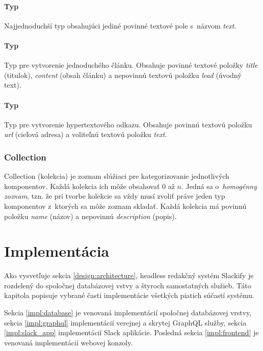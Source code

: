 \subsubsection{Typ }
Najjednoduchší typ obsahujúci jediné povinné textové pole s~názvom \emph{text}.

\subsubsection{Typ }
Typ pre vytvorenie jednoduchého článku. Obsahuje povinné textové položky \emph{title} (titulok), \emph{content} (obsah článku) a nepovinnú textovú položku \emph{lead} (úvodný text).

\subsubsection{Typ }
Typ pre vytvorenie hypertextového odkazu. Obsahuje povinnú textovú položku \emph{url} (cieľová adresa) a voliteľnú textovú položku \emph{text}.

\subsection{Collection}
\label{design:collection}
Collection (kolekcia) je zoznam slúžiaci pre kategorizovanie jednotlivých komponentov. Každá kolekcia ich môže obsahovať 0 až $n$. Jedná sa o~\emph{homogénny zoznam}, tzn. že pri tvorbe kolekcie sa vždy musí zvoliť práve jeden typ komponentov z~ktorých sa môže zoznam skladať. Každá kolekcia má povinnú položku \emph{name} (názov) a nepovinnú \emph{description} (popis).

\chapter{Implementácia}
\label{impl}
Ako vysvetľuje sekcia \ref{design:architecture}, headless redakčný systém Slackify je rozdelený do spoločnej databázovej vstvy a štyroch samostatných služieb. Táto kapitola popisuje vybrané časti implementácie všetkých piatich súčastí systému.

Sekcia \ref{impl:database} je venovaná implementácií spoločnej databázovej vrstvy, sekcia \ref{impl:graphql} implementácií verejnej a skrytej GraphQL služby, sekcia \ref{impl:slack_app} implementácií Slack aplikácie. Posledná sekcia \ref{impl:frontend} je venovaná implementácií webovej konzoly.


